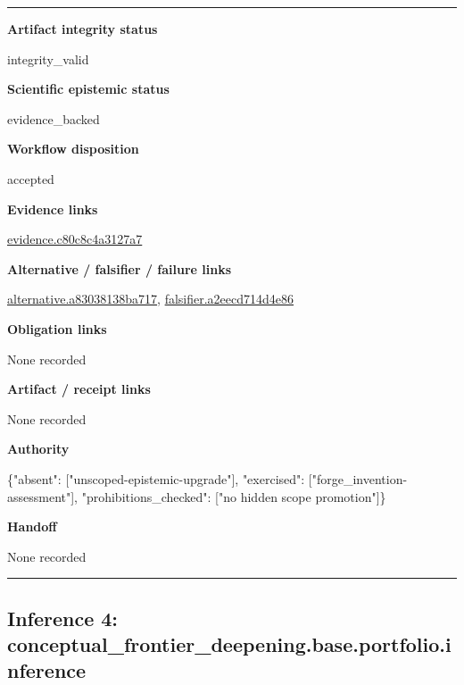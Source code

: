 \documentclass[10pt,a4paper]{article}
\newcommand{\TraceField}[2]{\par\noindent\textbf{#1}\par\noindent #2\par\smallskip}
\newenvironment{TraceDossier}{\par\medskip\noindent\hrule\medskip}{\medskip\hrule\par\medskip}
\begin{document}
\begin{TraceDossier}
\TraceField{Artifact integrity status}{integrity\_\allowbreak{}valid}

\TraceField{Scientific epistemic status}{evidence\_\allowbreak{}backed}

\TraceField{Workflow disposition}{accepted}

\TraceField{Evidence links}{\hyperlink{trace-evidence-2a5ecf291a32f84f37}{evidence.\allowbreak{}c80c8c4a31\allowbreak{}27a7}}

\TraceField{Alternative / falsifier / failure links}{\hyperlink{trace-alternative-1fc2946cbbc791bd86}{alternativ\allowbreak{}e.\allowbreak{}a83038138b\allowbreak{}a717}, \hyperlink{trace-alternative-580a4c1762bae22d2c}{falsifier.\allowbreak{}a2eecd714d\allowbreak{}4e86}}

\TraceField{Obligation links}{None recorded}

\TraceField{Artifact / receipt links}{None recorded}

\TraceField{Authority}{\{"absent":\allowbreak{} ["unscoped\allowbreak{}-\allowbreak{}epistemic-\allowbreak{}upgrade"],\allowbreak{} "exercised\allowbreak{}":\allowbreak{} ["forge\_\allowbreak{}invention-\allowbreak{}assessment\allowbreak{}"], "prohibiti\allowbreak{}ons\_\allowbreak{}checked":\allowbreak{} ["no hidden scope promotion"\allowbreak{}]\}}

\TraceField{Handoff}{None recorded}

\end{TraceDossier}
\pagebreak[2]\subsection{Inference 4: conceptual\allowbreak{}\_\allowbreak{}frontier\_\allowbreak{}deepening.\allowbreak{}base.\allowbreak{}portfolio.\allowbreak{}inference}\label{trace-inference-308dce425d232a2ee7}
\end{document}
